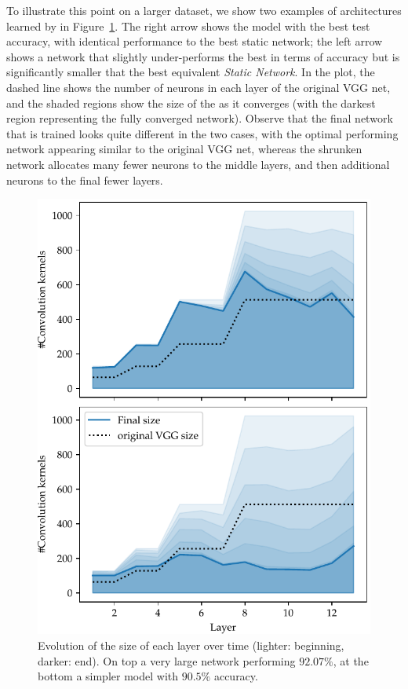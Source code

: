 To illustrate this point on a larger dataset, we show two examples of
architectures learned by \shrink in
Figure~\ref{fig:network_size_evolution}.  The right arrow shows the model with the
best test accuracy, with identical performance to the best static
network; the left arrow shows a network that slightly under-performs the best in
terms of accuracy but is significantly smaller that the best equivalent
\textit{Static Network}.  In the plot, the dashed line
shows the number of neurons in each layer of the original VGG net, and the
shaded regions show the size of the \shrink as it converges (with the darkest
region representing the fully converged network).  Observe that the final
network that is trained looks quite different in the two cases, with the optimal
performing network appearing similar to the original VGG net, whereas the
shrunken network allocates many fewer neurons to the middle layers, and then
additional neurons to the final fewer layers.


\begin{figure}[h]
\begin{center}
\vspace{-.1in}
\includegraphics[width=.6\columnwidth]{size_evolution}
\vspace*{-5mm} 
\caption{ Evolution of the size of
  each layer over time (lighter: beginning, darker: end). On top a very large
  network performing $92.07\%$, at the bottom a simpler model with $90.5\%$
  accuracy. 
} 
\label{fig:network_size_evolution}
\end{center}
\vspace*{-4mm}
\end{figure}


